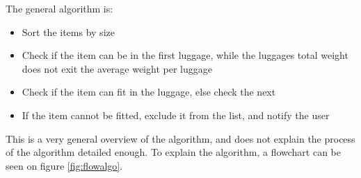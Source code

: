 The general algorithm is:
\begin{itemize}
	\item Sort the items by size
	\item Check if the item can be in the first luggage, while the luggages total weight does not exit the average weight per luggage
	\item	Check if the item can fit in the luggage, else check the next
	\item  If the item cannot be fitted, exclude it from the list, and notify the user
\end{itemize}

This is a very general overview of the algorithm, and does not explain the process of the algorithm detailed enough. To explain the algorithm, a flowchart can be seen on figure \ref{fig:flowalgo}.


